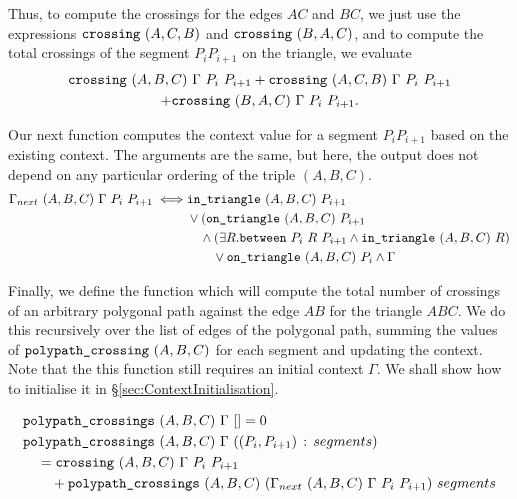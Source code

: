 Thus, to compute the crossings for the edges $AC$ and $BC$, we just use the expressions $\texttt{crossing}\ (A,C,B)$ and $\texttt{crossing}\ (B,A,C)$, and to compute the total crossings of the segment $P_iP_{i+1}$ on the triangle, we evaluate
\begin{multline}
\texttt{crossing}\ (A,B,C)\ \Gamma\ P_i\ P_{i+1} + \texttt{crossing}\ (A,C,B)\ \Gamma\ P_i\ P_{i+1}\\ + \texttt{crossing}\ (B,A,C)\ \Gamma\ P_i\ P_{i+1}.
\end{multline}

Our next function computes the context value for a segment $P_iP_{i+1}$ based on the existing context. The arguments are the same, but here, the output does not depend on any particular ordering of the triple $(A,B,C)$.
\begin{equation}
\begin{split}
\Gamma_{next}\ (A,B,C)\ \Gamma\ P_i\ P_{i+1} \iff &\texttt{in\_triangle}\ (A,B,C)\ P_{i+1}\\
& \vee (\texttt{on\_triangle}\ (A,B,C)\ P_{i+1}\\
& \quad \wedge (\exists R. \texttt{between}\ P_i\ R\ P_{i+1} \wedge \texttt{in\_triangle}\ (A,B,C)\ R)\\
& \qquad \vee \texttt{on\_triangle}\ (A,B,C)\ P_i \wedge \Gamma
\end{split}
\end{equation}

Finally, we define the function which will compute the total number of crossings of an arbitrary polygonal path against the edge $AB$ for the triangle $ABC$. We do this recursively over the list of edges of the polygonal path, summing the values of $\texttt{polypath\_crossing}\ (A,B,C)$ for each segment and updating the context. Note that the this function still requires an initial context $\Gamma$. We shall show how to initialise it in \S\ref{sec:ContextInitialisation}.

\begin{equation}
\begin{aligned}
&\texttt{polypath\_crossings}\ (A,B,C)\ \Gamma\ [] = 0\\
&\texttt{polypath\_crossings}\ (A,B,C)\ \Gamma\ ((P_i,P_{i+1})\,:\,segments)\\
 &\quad= \texttt{crossing}\ (A,B,C)\ \Gamma\ P_i\ P_{i+1}\\
 &\qquad+ \texttt{polypath\_crossings}\ (A,B,C)\ (\Gamma_{next}\ (A,B,C)\ \Gamma\ P_i\ P_{i+1})\ segments
\end{aligned}
\end{equation}

